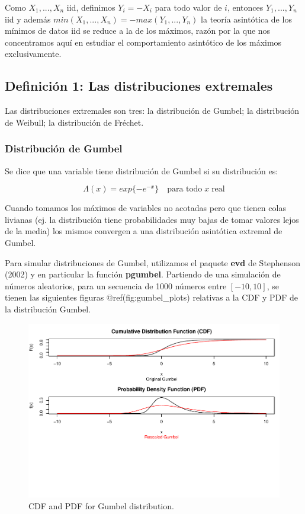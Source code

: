 \documentclass[
  oneside]{book}
\begin{document}
Como \(X_1,...,X_n\) iid, definimos \(Y_i = -X_i\) para todo valor de
\(i\), entonces \(Y_1,...,Y_n\) iid y además
\(min(X_1,...,X_n) = - max(Y_1,...,Y_n)\) la teoría asintótica de los
mínimos de datos iid se reduce a la de los máximos, razón por la que nos
concentramos aquí en estudiar el comportamiento asintótico de los
máximos exclusivamente.

\newpage

\hypertarget{definiciuxf3n-1-las-distribuciones-extremales}{%
\subsection{Definición 1: Las distribuciones
extremales}\label{definiciuxf3n-1-las-distribuciones-extremales}}

Las distribuciones extremales son tres: la distribución de Gumbel; la
distribución de Weibull; la distribución de Fréchet.

\hypertarget{distribuciuxf3n-de-gumbel}{%
\subsubsection{Distribución de Gumbel}\label{distribuciuxf3n-de-gumbel}}

Se dice que una variable tiene distribución de Gumbel si su distribución
es:

\[ \Lambda(x) = exp\{-e^{-x}\} \quad\text{para todo}\; x \;\text{real} \]

Cuando tomamos los máximos de variables no acotadas pero que tienen
colas livianas (ej. la distribución tiene probabilidades muy bajas de
tomar valores lejos de la media) los mismos convergen a una distribución
asintótica extremal de Gumbel.

Para simular distribuciones de Gumbel, utilizamos el paquete
\textbf{evd} de Stephenson (2002) y en particular la función
\textbf{pgumbel}. Partiendo de una simulación de números aleatorios,
para un secuencia de 1000 números entre \([-10,10]\), se tienen las
siguientes figuras @ref(fig:gumbel\_plots) relativas a la CDF y PDF de
la distribución Gumbel.

\begin{figure}
\centering
\includegraphics{extremales_files/figure-latex/gumbel_plots-1.pdf}
\caption{CDF and PDF for Gumbel distribution.}
\end{figure}
\end{document}
